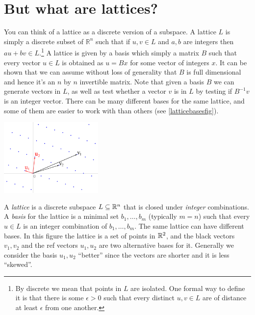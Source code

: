 \section{But what are lattices?}\label{11-But-what-are-lattices}

You can think of a lattice as a discrete version of a subspace. A
lattice \(L\) is simply a discrete subset of \(\mathbb{R}^n\) such that
if \(u,v\in L\) and \(a,b\) are integers then \(au+bv\in L\).\footnote{By
  discrete we mean that points in \(L\) are isolated. One formal way to
  define it is that there is some \(\epsilon>0\) such that every
  distinct \(u,v \in L\) are of distance at least \(\epsilon\) from one
  another.} A lattice is given by a basis which simply a matrix \(B\)
such that every vector \(u\in L\) is obtained as \(u=Bx\) for some
vector of integers \(x\). It can be shown that we can assume without
loss of generality that \(B\) is full dimensional and hence it's an
\(n\) by \(n\) invertible matrix. Note that given a basis \(B\) we can
generate vectors in \(L\), as well as test whether a vector \(v\) is in
\(L\) by testing if \(B^{-1}v\) is an integer vector. There can be many
different bases for the same lattice, and some of them are easier to
work with than others (see \cref{latticebasesfig}).

\begin{marginfigure}
\centering
\includegraphics[width=\linewidth, height=1.5in, keepaspectratio]{../figure/Lattice-reduction.png}
\caption{A \emph{lattice} is a discrete subspace \(L \subseteq {\mathbb{R}}^n\)
that is closed under \emph{integer} combinations. A \emph{basis} for the
lattice is a minimal set \(b_1,\ldots,b_m\) (typically \(m=n\)) such
that every \(u \in L\) is an integer combination of \(b_1,\ldots,b_m\).
The same lattice can have different bases. In this figure the lattice is
a set of points in \({\mathbb{R}}^2\), and the black vectors \(v_1,v_2\) and the
ref vectors \(u_1,u_2\) are two alternative bases for it. Generally we
consider the basis \(u_1,u_2\) ``better'' since the vectors are shorter
and it is less ``skewed''.}
\label{latticebasesfig}
\end{marginfigure}

